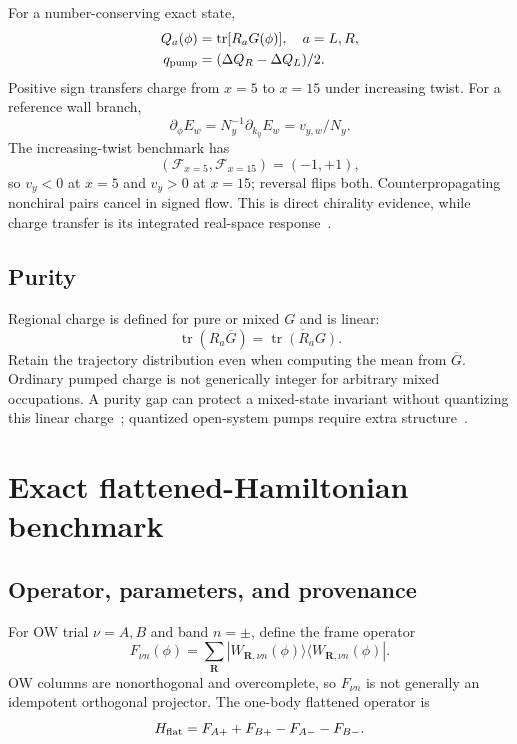 \documentclass[aps,prb,onecolumn,nofootinbib,superscriptaddress]{revtex4-2}
\newcommand{\tr}{\operatorname{tr}}
\newcommand{\cF}{\mathcal{F}}
\begin{document}
For a number-conserving exact state,
\begin{align}
 Q_a(\phi)&=\tr[R_aG(\phi)],\quad a=L,R,\\
 q_{\rm pump}&=(\Delta Q_R-\Delta Q_L)/2.
 \label{eq:qpump}
\end{align}
Positive sign transfers charge from $x=5$ to $x=15$ under increasing twist.
For a reference wall branch,
\begin{equation}
 \partial_\phi E_w=N_y^{-1}\partial_{k_y}E_w=v_{y,w}/N_y.
 \label{eq:velocity}
\end{equation}
The increasing-twist benchmark has
\begin{equation}
 (\cF_{x=5},\cF_{x=15})=(-1,+1),
 \label{eq:flowsign}
\end{equation}
so $v_y<0$ at $x=5$ and $v_y>0$ at $x=15$; reversal flips both.
Counterpropagating nonchiral pairs cancel in signed flow.  This is direct
chirality evidence, while charge transfer is its integrated real-space
response~\cite{Hatsugai1993,Yasuda2017}.

\subsection{Purity}

Regional charge is defined for pure or mixed $G$ and is linear:
\begin{equation}
 \tr(R_a\overline G)=\overline{\tr(R_aG)}.
\end{equation}
Retain the trajectory distribution even when computing the mean from
$\overline G$.  Ordinary pumped charge is not generically integer for arbitrary
mixed occupations.  A purity gap can protect a mixed-state invariant without
quantizing this linear charge~\cite{BudichDiehl2015,Bardyn2018}; quantized
open-system pumps require extra structure~\cite{Linzner2016}.

\section{Exact flattened-Hamiltonian benchmark}
\label{sec:exact}

\subsection{Operator, parameters, and provenance}

For OW trial $\nu=A,B$ and band $n=\pm$, define the frame operator
\begin{equation}
 F_{\nu n}(\phi)=\sum_{\bm R}
 |W_{\bm R,\nu n}(\phi)\rangle\langle W_{\bm R,\nu n}(\phi)|.
\end{equation}
OW columns are nonorthogonal and overcomplete, so $F_{\nu n}$ is not generally
an idempotent orthogonal projector.  The one-body flattened operator is
\begin{equation}
 H_{\rm flat}=F_{A+}+F_{B+}-F_{A-}-F_{B-}.
\end{equation}
\end{document}
